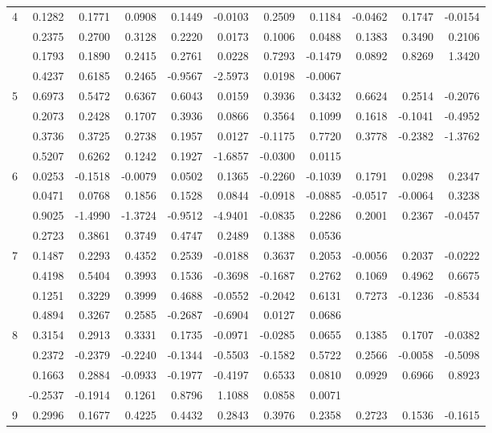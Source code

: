 \documentclass{article}
\begin{document}
\begin{tabular}{ |l|r|r|r|r|r|r|r|r|r|r| }
4 & 0.1282 & 0.1771 & 0.0908 & 0.1449 &-0.0103 & 0.2509 & 0.1184 &-0.0462 & 0.1747 &-0.0154 \\
  & 0.2375 & 0.2700 & 0.3128 & 0.2220 & 0.0173 & 0.1006 & 0.0488 & 0.1383 & 0.3490 & 0.2106 \\
  & 0.1793 & 0.1890 & 0.2415 & 0.2761 & 0.0228 & 0.7293 &-0.1479 & 0.0892 & 0.8269 & 1.3420 \\
  & 0.4237 & 0.6185 & 0.2465 &-0.9567 &-2.5973 & 0.0198 &-0.0067 & & & \\
5 & 0.6973 & 0.5472 & 0.6367 & 0.6043 & 0.0159 & 0.3936 & 0.3432 & 0.6624 & 0.2514 &-0.2076 \\
  & 0.2073 & 0.2428 & 0.1707 & 0.3936 & 0.0866 & 0.3564 & 0.1099 & 0.1618 &-0.1041 &-0.4952 \\
  & 0.3736 & 0.3725 & 0.2738 & 0.1957 & 0.0127 &-0.1175 & 0.7720 & 0.3778 &-0.2382 &-1.3762 \\
  & 0.5207 & 0.6262 & 0.1242 & 0.1927 &-1.6857 &-0.0300 & 0.0115 & & & \\
6 & 0.0253 &-0.1518 &-0.0079 & 0.0502 & 0.1365 &-0.2260 &-0.1039 & 0.1791 & 0.0298 & 0.2347 \\
  & 0.0471 & 0.0768 & 0.1856 & 0.1528 & 0.0844 &-0.0918 &-0.0885 &-0.0517 &-0.0064 & 0.3238 \\
  & 0.9025 &-1.4990 &-1.3724 &-0.9512 &-4.9401 &-0.0835 & 0.2286 & 0.2001 & 0.2367 &-0.0457 \\
  & 0.2723 & 0.3861 & 0.3749 & 0.4747 & 0.2489 & 0.1388 & 0.0536 & & & \\
7 & 0.1487 & 0.2293 & 0.4352 & 0.2539 &-0.0188 & 0.3637 & 0.2053 &-0.0056 & 0.2037 &-0.0222 \\
  & 0.4198 & 0.5404 & 0.3993 & 0.1536 &-0.3698 &-0.1687 & 0.2762 & 0.1069 & 0.4962 & 0.6675 \\
  & 0.1251 & 0.3229 & 0.3999 & 0.4688 &-0.0552 &-0.2042 & 0.6131 & 0.7273 &-0.1236 &-0.8534 \\
  & 0.4894 & 0.3267 & 0.2585 &-0.2687 &-0.6904 & 0.0127 & 0.0686 & & & \\
8 & 0.3154 & 0.2913 & 0.3331 & 0.1735 &-0.0971 &-0.0285 & 0.0655 & 0.1385 & 0.1707 &-0.0382 \\
  & 0.2372 &-0.2379 &-0.2240 &-0.1344 &-0.5503 &-0.1582 & 0.5722 & 0.2566 &-0.0058 &-0.5098 \\
  & 0.1663 & 0.2884 &-0.0933 &-0.1977 &-0.4197 & 0.6533 & 0.0810 & 0.0929 & 0.6966 & 0.8923 \\
  &-0.2537 &-0.1914 & 0.1261 & 0.8796 & 1.1088 & 0.0858 & 0.0071 & & & \\
9 & 0.2996 & 0.1677 & 0.4225 & 0.4432 & 0.2843 & 0.3976 & 0.2358 & 0.2723 & 0.1536 &-0.1615 \\

\end{tabular}
\end{document}
